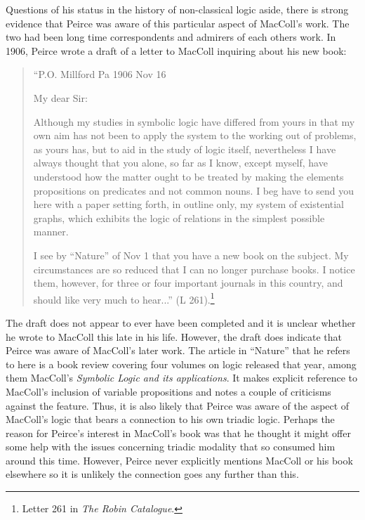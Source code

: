 Questions of his status in the history of non-classical logic aside, there is strong evidence that Peirce was aware of this particular aspect of MacColl's work. The two had been long time correspondents and admirers of each others work. In 1906, Peirce wrote a draft of a letter to MacColl inquiring about his new book:
\begin{quotation}
``P.O. Millford Pa 1906 Nov 16

My dear Sir:

Although my studies in symbolic logic have differed from yours in that my own aim has not been to apply the system to the working out of problems, as yours has, but to aid in the study of logic itself, nevertheless I have always thought that you alone, so far as I know, except myself, have understood how the matter ought to be treated by making the elements propositions on predicates and not common nouns. I beg have to send you here with a paper setting forth, in outline only, my system of existential graphs, which exhibits the logic of relations in the simplest possible manner.

I see by ``Nature'' of Nov 1 that you have a new book on the subject. My circumstances are so reduced that I can no longer purchase books. I notice them, however, for three or four important journals in this country, and should like very much to hear...'' (L 261).\footnote{Letter 261 in \textit{The Robin Catalogue}.}
\end{quotation}
\noindent The draft does not appear to ever have been completed and it is unclear whether he wrote to MacColl this late in his life. However, the draft does indicate that Peirce was aware of MacColl's later work. The article in ``Nature'' that he refers to here is a book review covering four volumes on logic released that year, among them MacColl's \textit{Symbolic Logic and its applications}. It makes explicit reference to MacColl's inclusion of variable propositions and notes a couple of criticisms against the feature. Thus, it is also likely that Peirce was aware of the aspect of MacColl's logic that bears a connection to his own triadic logic. Perhaps the reason for Peirce's interest in MacColl's book was that he thought it might offer some help with the issues concerning triadic modality that so consumed him around this time. However, Peirce never explicitly mentions MacColl or his book elsewhere so it is unlikely the connection goes any further than this.

